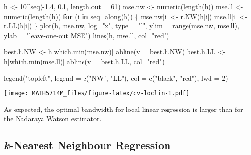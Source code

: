 \documentclass[
  a4paper,
]{article}
\newenvironment{Shaded}{\begin{snugshade}}{\end{snugshade}}
\newcommand{\AttributeTok}[1]{\textcolor[rgb]{0.77,0.63,0.00}{#1}}
\newcommand{\ControlFlowTok}[1]{\textcolor[rgb]{0.13,0.29,0.53}{\textbf{#1}}}
\newcommand{\DecValTok}[1]{\textcolor[rgb]{0.00,0.00,0.81}{#1}}
\newcommand{\FloatTok}[1]{\textcolor[rgb]{0.00,0.00,0.81}{#1}}
\newcommand{\FunctionTok}[1]{\textcolor[rgb]{0.00,0.00,0.00}{#1}}
\newcommand{\NormalTok}[1]{#1}
\newcommand{\OtherTok}[1]{\textcolor[rgb]{0.56,0.35,0.01}{#1}}
\newcommand{\SpecialCharTok}[1]{\textcolor[rgb]{0.00,0.00,0.00}{#1}}
\newcommand{\StringTok}[1]{\textcolor[rgb]{0.31,0.60,0.02}{#1}}
\theoremstyle{definition}
\theoremstyle{definition}
\theoremstyle{definition}
\theoremstyle{definition}
\theoremstyle{remark}
\begin{document}
\begin{Shaded}
\begin{Highlighting}[]
\NormalTok{h }\OtherTok{\textless{}{-}} \DecValTok{10}\SpecialCharTok{\^{}}\FunctionTok{seq}\NormalTok{(}\SpecialCharTok{{-}}\FloatTok{1.4}\NormalTok{, }\FloatTok{0.1}\NormalTok{, }\AttributeTok{length.out =} \DecValTok{61}\NormalTok{)}
\NormalTok{mse.nw }\OtherTok{\textless{}{-}} \FunctionTok{numeric}\NormalTok{(}\FunctionTok{length}\NormalTok{(h))}
\NormalTok{mse.ll }\OtherTok{\textless{}{-}} \FunctionTok{numeric}\NormalTok{(}\FunctionTok{length}\NormalTok{(h))}
\ControlFlowTok{for}\NormalTok{ (i }\ControlFlowTok{in} \FunctionTok{seq\_along}\NormalTok{(h)) \{}
\NormalTok{    mse.nw[i] }\OtherTok{\textless{}{-}} \FunctionTok{r.NW}\NormalTok{(h[i])}
\NormalTok{    mse.ll[i] }\OtherTok{\textless{}{-}} \FunctionTok{r.LL}\NormalTok{(h[i])}
\NormalTok{\}}
\FunctionTok{plot}\NormalTok{(h, mse.nw, }\AttributeTok{log=}\StringTok{"x"}\NormalTok{, }\AttributeTok{type =} \StringTok{"l"}\NormalTok{, }\AttributeTok{ylim =} \FunctionTok{range}\NormalTok{(mse.nw, mse.ll),}
     \AttributeTok{ylab =} \StringTok{"leave{-}one{-}out MSE"}\NormalTok{)}
\FunctionTok{lines}\NormalTok{(h, mse.ll, }\AttributeTok{col=}\StringTok{"red"}\NormalTok{)}

\NormalTok{best.h.NW }\OtherTok{\textless{}{-}}\NormalTok{ h[}\FunctionTok{which.min}\NormalTok{(mse.nw)]}
\FunctionTok{abline}\NormalTok{(}\AttributeTok{v =}\NormalTok{ best.h.NW)}
\NormalTok{best.h.LL }\OtherTok{\textless{}{-}}\NormalTok{ h[}\FunctionTok{which.min}\NormalTok{(mse.ll)]}
\FunctionTok{abline}\NormalTok{(}\AttributeTok{v =}\NormalTok{ best.h.LL, }\AttributeTok{col=}\StringTok{"red"}\NormalTok{)}

\FunctionTok{legend}\NormalTok{(}\StringTok{"topleft"}\NormalTok{, }\AttributeTok{legend =} \FunctionTok{c}\NormalTok{(}\StringTok{"NW"}\NormalTok{, }\StringTok{"LL"}\NormalTok{), }\AttributeTok{col =} \FunctionTok{c}\NormalTok{(}\StringTok{"black"}\NormalTok{, }\StringTok{"red"}\NormalTok{),}
       \AttributeTok{lwd =} \DecValTok{2}\NormalTok{)}
\end{Highlighting}
\end{Shaded}

\texttt{[image: MATH5714M\_files/figure-latex/cv-loclin-1.pdf]}

As expected, the optimal bandwidth for local linear regression is
larger than for the Nadaraya Watson estimator.

\hypertarget{k-nearest-neighbour-regression}{%
\subsection{\texorpdfstring{\emph{k}-Nearest Neighbour Regression}{k-Nearest Neighbour Regression}}\label{k-nearest-neighbour-regression}}
\end{document}
